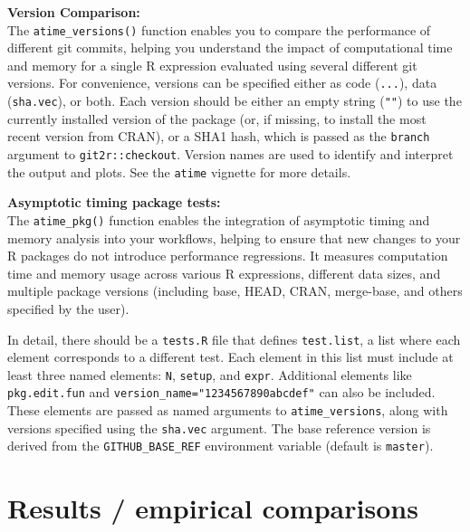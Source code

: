 \textbf{Version Comparison:} \\
The \texttt{atime\_versions()} function enables you to compare the performance of different git commits, helping you understand the impact of computational time and memory for a single R expression evaluated using several different git versions.
For convenience, versions can be specified either as code (\texttt{...}), data (\texttt{sha.vec}), or both. Each version should be either an empty string (\texttt{""}) to use the currently installed version of the package (or, if missing, to install the most recent version from CRAN), or a SHA1 hash, which is passed as the \texttt{branch} argument to \texttt{git2r::checkout}. Version names are used to identify and interpret the output and plots. See the \texttt{atime} vignette for more details.

\vspace{0.1in}

\textbf{Asymptotic timing package tests:} \\

The \texttt{atime\_pkg()} function enables the integration of asymptotic timing and memory analysis into your workflows, helping to ensure that new changes to your R packages do not introduce performance regressions. It measures computation time and memory usage across various R expressions, different data sizes, and multiple package versions (including base, HEAD, CRAN, merge-base, and others specified by the user).

In detail, there should be a \texttt{tests.R} file that defines \texttt{test.list}, a list where each element corresponds to a different test. Each element in this list must include at least three named elements: \texttt{N}, \texttt{setup}, and \texttt{expr}. Additional elements like \texttt{pkg.edit.fun} and \texttt{version\_name="1234567890abcdef"} can also be included. These elements are passed as named arguments to \texttt{atime\_versions}, along with versions specified using the \texttt{sha.vec} argument. The base reference version is derived from the \texttt{GITHUB\_BASE\_REF} environment variable (default is \texttt{master}).


\vspace{0.1in}

\section{Results / empirical comparisons}

